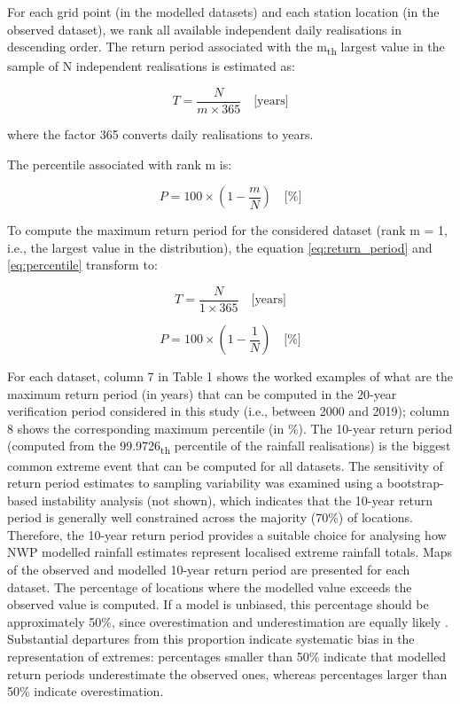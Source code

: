 \documentclass{ametsocV6.1}
\begin{document}
For each grid point (in the modelled datasets) and each station location (in the observed dataset), we rank all available independent daily realisations in descending order. The return period associated with the m\textsubscript{th} largest value in the sample of N independent realisations is estimated as:

\begin{equation}
T = \frac{N}{m \times 365} \quad \text{[years]}
\label{eq:return_period}
\end{equation}

where the factor 365 converts daily realisations to years.

The percentile associated with rank m is:

\begin{equation}
P = 100 \times \left(1 - \frac{m}{N}\right) \quad \text{[\%]}
\label{eq:percentile}
\end{equation}

To compute the maximum return period for the considered dataset (rank m = 1, i.e., the largest value in the distribution), the equation \ref{eq:return_period} and \ref{eq:percentile} transform to:

\begin{equation}
T = \frac{N}{1 \times 365} \quad \text{[years]}
\label{eq:max_return_period}
\end{equation}

\begin{equation}
P = 100 \times \left(1 - \frac{1}{N}\right) \quad \text{[\%]}
\label{eq:max_percentile}
\end{equation}

For each dataset, column 7 in Table 1 shows the worked examples of what are the maximum return period (in years) that can be computed in the 20-year verification period considered in this study (i.e., between 2000 and 2019); column 8 shows the corresponding maximum percentile (in \%). The 10-year return period (computed from the 99.9726\textsubscript{th} percentile of the rainfall realisations) is the biggest common extreme event that can be computed for all datasets. The sensitivity of return period estimates to sampling variability was examined using a bootstrap-based instability analysis (not shown), which indicates that the 10-year return period is generally well constrained across the majority (70\%) of locations. Therefore, the 10-year return period provides a suitable choice for analysing how NWP modelled rainfall estimates represent localised extreme rainfall totals. Maps of the observed and modelled 10-year return period are presented for each dataset. The percentage of locations where the modelled value exceeds the observed value is computed. If a model is unbiased, this percentage should be approximately 50\%, since overestimation and underestimation are equally likely \citep{Wilks2020}. Substantial departures from this proportion indicate systematic bias in the representation of extremes: percentages smaller than 50\% indicate that modelled return periods underestimate the observed ones, whereas percentages larger than 50\% indicate overestimation.
\end{document}
